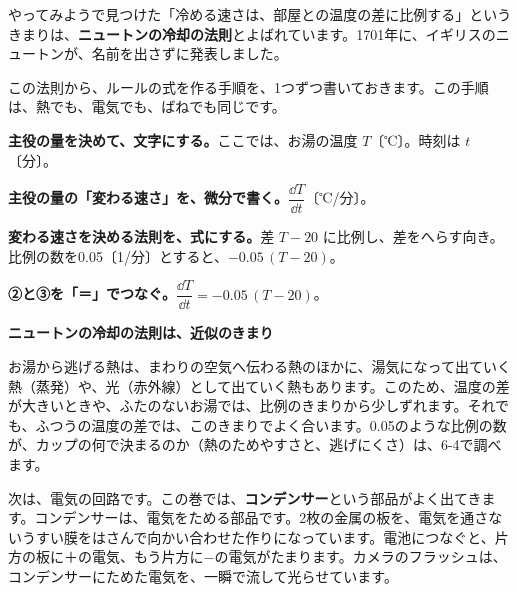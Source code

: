 
\label{bk:6-1:netsu}やってみようで見つけた「冷める速さは、部屋との温度の差に比例する」というきまりは、\textbf{ニュートンの冷却の法則}とよばれています。1701年に、イギリスのニュートンが、名前を出さずに発表しました。

この法則から、ルールの式を作る手順を、1つずつ書いておきます。この手順は、熱でも、電気でも、ばねでも同じです。
\begin{enumerate}[label={\bkcircled[\bkTT]{\arabic*}}, leftmargin=2.4\zw, itemsep=2pt, topsep=3pt]
\item \textbf{主役の量を決めて、文字にする。}\enspace ここでは、お湯の温度 $T$〔℃〕。時刻は $t$〔分〕。
\item \textbf{主役の量の「変わる速さ」を、微分で書く。}\enspace $\dfrac{\dd T}{\dd t}$〔℃/分〕。
\item \textbf{変わる速さを決める法則を、式にする。}\enspace 差 $T-20$ に比例し、差をへらす向き。比例の数を0.05〔1/分〕とすると、$-0.05\,(T-20)$。
\item \textbf{②と③を「＝」でつなぐ。}\enspace $\dfrac{\dd T}{\dd t}=-0.05\,(T-20)$。
\end{enumerate}

\begin{seikaku}
\textbf{ニュートンの冷却の法則は、近似のきまり}\par
お湯から逃げる熱は、まわりの空気へ伝わる熱のほかに、湯気になって出ていく熱（蒸発）や、光（赤外線）として出ていく熱もあります。このため、温度の差が大きいときや、ふたのないお湯では、比例のきまりから少しずれます。それでも、ふつうの温度の差では、このきまりでよく合います。0.05のような比例の数が、カップの何で決まるのか（熱のためやすさと、逃げにくさ）は、6-4で調べます。
\end{seikaku}


\label{bk:6-1:denki}次は、電気の回路です。この巻では、\textbf{コンデンサー}という部品がよく出てきます。コンデンサーは、電気をためる部品です。2枚の金属の板を、電気を通さないうすい膜をはさんで向かい合わせた作りになっています。電池につなぐと、片方の板に＋の電気、もう片方に$-$の電気がたまります。カメラのフラッシュは、コンデンサーにためた電気を、一瞬で流して光らせています。

